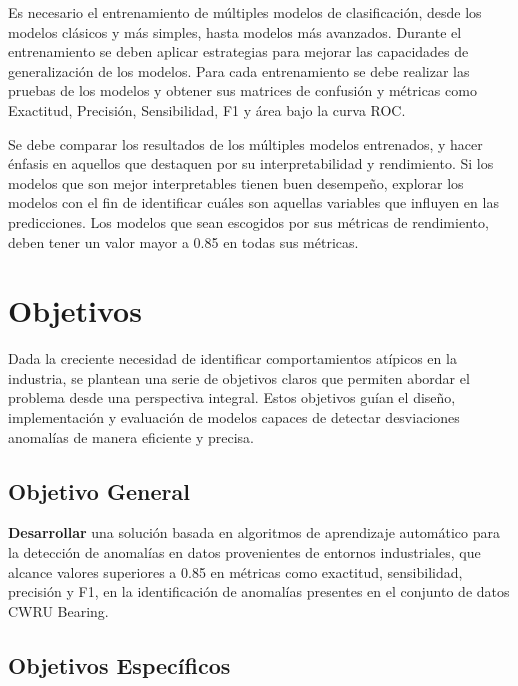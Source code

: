 \documentclass[11pt,a4paper,spanish]{book}
\numberwithin{equation}{chapter}
\numberwithin{figure}{chapter}
\begin{document}
Es necesario el entrenamiento de múltiples modelos de clasificación, desde los modelos 
clásicos y más simples, hasta modelos más avanzados. Durante el entrenamiento se deben 
aplicar estrategias para mejorar las capacidades de generalización de los modelos. 
Para cada entrenamiento se debe realizar las pruebas de los modelos y obtener sus 
matrices de confusión y métricas como  Exactitud, Precisión, Sensibilidad, F1 y 
área bajo la curva ROC.


Se debe comparar los resultados de los múltiples modelos entrenados, y hacer énfasis en 
aquellos que destaquen por su interpretabilidad y rendimiento. Si los modelos que son 
mejor interpretables tienen buen desempeño, explorar los modelos con el fin de 
identificar cuáles son aquellas variables que influyen en las predicciones. 
Los modelos que sean escogidos por sus métricas de rendimiento, deben tener un valor 
mayor a 0.85 en todas sus métricas. 


\chapter{Objetivos}

Dada la creciente necesidad de identificar comportamientos atípicos en la industria, 
se plantean una serie de objetivos claros que permiten abordar el problema desde una 
perspectiva integral. 
Estos objetivos guían el diseño, implementación y evaluación de modelos capaces de 
detectar desviaciones anomalías de manera eficiente y precisa.


\section{Objetivo General}

\textbf{Desarrollar} una solución basada en algoritmos de aprendizaje automático para 
la detección de anomalías en datos provenientes de entornos industriales, 
que alcance valores superiores a 0.85 en métricas como exactitud, sensibilidad, 
precisión y F1, en la identificación de anomalías presentes en el conjunto de datos 
CWRU Bearing.

\section{Objetivos Específicos}
\end{document}
